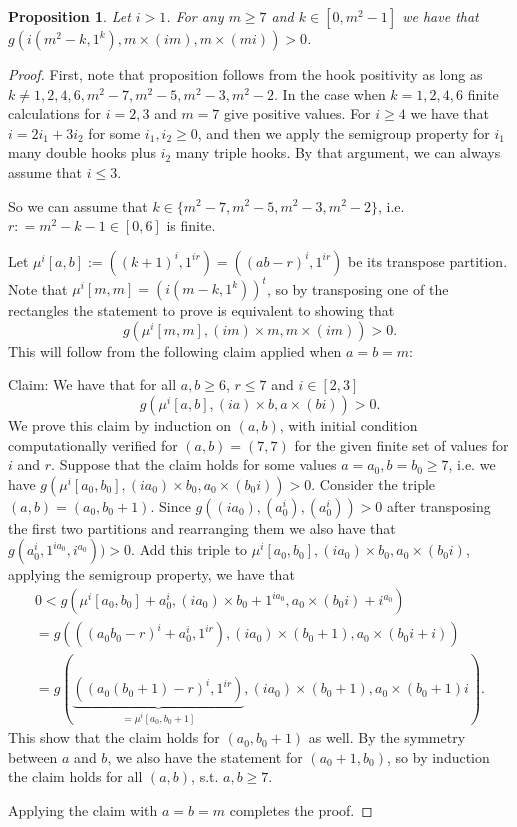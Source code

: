 \documentclass{article}
\numberwithin{equation}{section}
\newtheorem{proposition}[equation]{Proposition}
\theoremstyle{definition}
\begin{document}
\begin{proposition}\label{prop:stretchedhooks}
Let $i>1$. For any  $m  \geq 7$ and $k\in[0, m^2 -1 ]$ we have that $g( i(m^2-k, 1^k), m \times (im), m \times (mi) )>0$.
\end{proposition} 
\begin{proof}
 First, note that proposition follows from the hook positivity as long as $k \neq 1,2,4,6, m^2-7, m^2-5, m^2-3, m^2-2$. In the  case when $k=1,2,4,6$  finite calculations for $i=2,3$ and $m=7$ give positive values. For $i\geq 4$ we have that $i = 2i_1+ 3i_2$ for some $i_1,i_2 \geq 0$, and then we apply the semigroup property for $i_1$ many double hooks plus $i_2$ many triple hooks. By that argument, we can always assume that $i \leq 3$. 

So we can assume that $k \in\{ m^2-7, m^2 -5, m^2-3, m^2-2\}$, i.e. $r: = m^2 - k -1 \in [0,6]$ is finite.

 Let $\mu^i[a,b]:= ((k+1)^i, 1^{ir})=((ab-r)^i,1^{ir})$ be its transpose partition.
 Note that $\mu^i[m,m] = ( i(m-k, 1^k) )^t$, so by transposing one of the rectangles the statement to prove is equivalent to showing that 
 $$g( \mu^i[m,m], (im) \times m, m \times (im) )>0.$$
 This will follow from the following claim applied when $a=b=m$:
 
Claim: We have that for all $a,b \geq 6$, $r \leq 7$ and $i \in [2,3]$
 $$g( \mu^i[a,b], (ia) \times b, a \times (bi))>0.$$  
 We prove this claim by induction on $(a,b)$, with initial condition computationally verified for $(a,b)=(7,7)$ for the given finite set of values for $i$ and $r$. 
 Suppose that the claim holds for some values $a=a_0 ,b=b_0 \geq 7$, i.e. we have
 $g( \mu^i[a_0,b_0], (ia_0) \times b_0, a_0 \times (b_0 i))>0$. Consider the triple $(a,b)=(a_0,b_0+1)$. Since $ g( (ia_0), (a_0^i), (a_0^i) )>0$ after transposing the first two partitions and rearranging them we also have that 
 $g( a_0^i, 1^{ia_0}, i^{a_0}) )>0$. Add this triple to $\mu^i[a_0,b_0], (ia_0) \times b_0, a_0 \times (b_0 i)$, applying the semigroup property, we have
 that 
 \begin{align*}
 0 < g( \mu^i[a_0,b_0] + a_0^i , (ia_0) \times b_0 + 1^{ia_0},a_0 \times (b_0 i) + i^{a_0} ) \\
 = g(  ( (a_0 b_0-r)^i +a_0^i,1^{ir} ) , (ia_0) \times (b_0+1), a_0 \times (b_0i + i) )
 \\
 = g( \underbrace{( (a_0 (b_0+1) -r)^i,1^{ir} ) }_{=\mu^i[a_0,b_0+1]}, (ia_0) \times (b_0+1), a_0 \times (b_0+1) i).
 \end{align*}
 This show that the claim holds for $(a_0,b_0+1)$ as well. By the symmetry between $a$ and $b$, we also have the statement for $(a_0+1,b_0)$, so by induction the claim holds for all $(a,b)$, s.t. $a,b \geq 7$. 
 
 Applying the claim with $a=b=m$ completes the proof.  


\end{proof}
\end{document}
